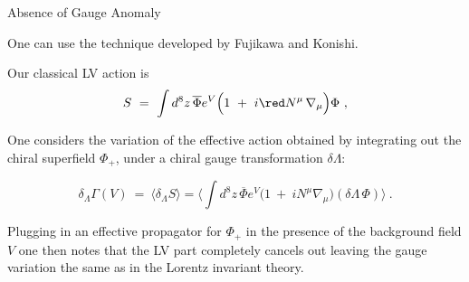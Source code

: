 \documentclass[pdf,PItalk,slideColor,colorBG,accumulate]{prosper}
\begin{document}

{
\begin{slide}[Replace]{ Absence of Gauge Anomaly }
	
	One can use the technique developed by Fujikawa and Konishi.

	Our classical LV action is
%
\begin{equation*}
S ~=~ \int d^8z\, \overline{\Phi} 
e^V \Big(1 ~+~ i {\red N^\mu}\, \nabla_\mu  \Big) \Phi~, 
\end{equation*}
%
	
	One considers the variation of the effective action obtained
	by integrating out the chiral superfield
	{\blue $ \Phi_+ $}, under a chiral gauge transformation
	{\blue $ \delta \Lambda $}:

%
\begin{equation*}
\delta_\Lambda\Gamma(V) ~=~ 
\langle \delta_\Lambda S \rangle = 
\Big\langle \int d^8z\,  \overline{\Phi} 
e^V \Big(1 ~+~ i N^\mu \nabla_\mu  \Big) (\delta \Lambda\, \Phi)
\Big\rangle~.
\end{equation*} 
%

	Plugging in an effective propagator for {\blue $ \Phi_+$}
	in the presence of the background field {\blue $ V $}
	one then notes that the LV part completely cancels out
	leaving the gauge variation the same as in the Lorentz
	invariant theory.

\end{slide}
}

\end{document}
